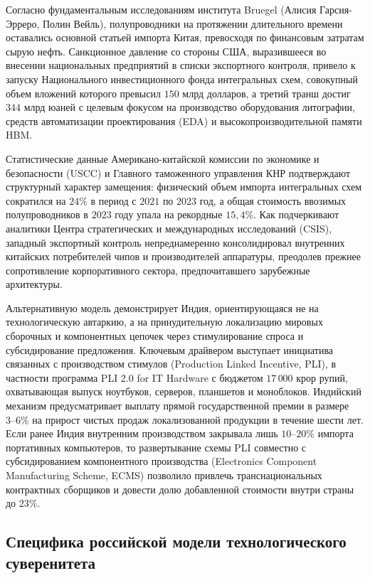 \documentclass[12pt,a4paper]{article}
\begin{document}
Согласно фундаментальным исследованиям института Bruegel 
(Алисия Гарсия-Эрреро, Полин Вейль), полупроводники на протяжении 
длительного времени оставались основной статьей импорта Китая, 
превосходя по финансовым затратам сырую нефть. Санкционное давление 
со стороны США, выразившееся во внесении национальных предприятий в 
списки экспортного контроля, привело к запуску 
Национального инвестиционного фонда интегральных схем, 
совокупный объем вложений которого превысил $150\text{ млрд}$ 
долларов, а третий транш достиг $344\text{ млрд}$ юаней с целевым 
фокусом на производство оборудования литографии, средств 
автоматизации проектирования (EDA) и высокопроизводительной памяти HBM.

Статистические данные Американо-китайской комиссии по экономике 
и безопасности (USCC) и Главного таможенного управления КНР 
подтверждают структурный характер замещения: физический объем 
импорта интегральных схем сократился на $24\%$ в период с $2021$ 
по $2023$ год, а общая стоимость ввозимых полупроводников в $2023$ году 
упала на рекордные $15{,}4\%$. Как подчеркивают аналитики Центра 
стратегических и международных исследований (CSIS), западный 
экспортный контроль непреднамеренно консолидировал внутренних 
китайских потребителей чипов и производителей аппаратуры, преодолев 
прежнее сопротивление корпоративного сектора, предпочитавшего 
зарубежные архитектуры.

Альтернативную модель демонстрирует Индия, ориентирующаяся не на 
технологическую автаркию, а на принудительную локализацию мировых 
сборочных и компонентных цепочек через стимулирование спроса и 
субсидирование предложения. Ключевым драйвером выступает инициатива 
связанных с производством стимулов (Production Linked Incentive, PLI), 
в частности программа PLI 2.0 for IT Hardware с бюджетом 
$17\,000\text{ крор}$ рупий, охватывающая выпуск ноутбуков, серверов, 
планшетов и моноблоков. Индийский механизм предусматривает выплату 
прямой государственной премии в размере $3\text{--}6\%$ на прирост 
чистых продаж локализованной продукции в течение шести лет. Если 
ранее Индия внутренним производством закрывала лишь $10\text{--}20\%$ 
импорта портативных компьютеров, то развертывание схемы PLI совместно 
с субсидированием компонентного производства (Electronics Component 
Manufacturing Scheme, ECMS) позволило привлечь транснациональных 
контрактных сборщиков и довести долю добавленной стоимости внутри 
страны до $23\%$.

\subsection{Специфика российской модели технологического суверенитета}
\end{document}
